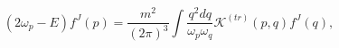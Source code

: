 \begin{equation}
\left( 2\omega _{p}-E\right) f^{J}(p)=\frac{m^{2}}{\left( 2\pi \right) ^{3}}%
\int \frac{q^{2}dq}{\omega _{p}\omega _{q}}\mathcal{K}^{\left( tr\right)
}(p,q)f^{J}(q),
\end{equation}

